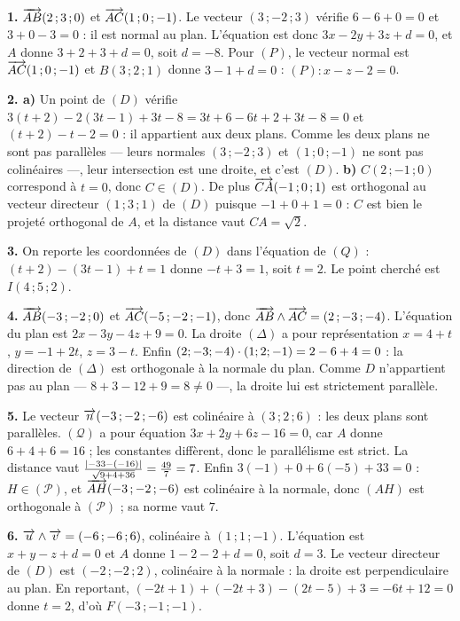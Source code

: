 \begin{corrige}[annales]
\textbf{1.} $\overrightarrow{AB}(2\,;3\,;0)$ et $\overrightarrow{AC}(1\,;0\,;-1)$. Le vecteur
$(3\,;-2\,;3)$ vérifie $6-6+0 = 0$ et $3+0-3 = 0$ : il est normal au plan.
L'équation est donc $3x-2y+3z+d = 0$, et $A$ donne $3+2+3+d = 0$, soit
$d = -8$. Pour $(P)$, le vecteur normal est $\overrightarrow{AC}(1\,;0\,;-1)$ et
$B(3\,;2\,;1)$ donne $3-1+d = 0$ : $(P) : x-z-2 = 0$.

\textbf{2. a)} Un point de $(D)$ vérifie
$3(t+2)-2(3t-1)+3t-8 = 3t+6-6t+2+3t-8 = 0$ et
$(t+2)-t-2 = 0$ : il appartient aux deux plans. Comme les deux plans ne sont
pas parallèles — leurs normales $(3\,;-2\,;3)$ et $(1\,;0\,;-1)$ ne sont pas
colinéaires —, leur intersection est une droite, et c'est $(D)$.
\textbf{b)} $C(2\,;-1\,;0)$ correspond à $t = 0$, donc $C \in (D)$. De plus
$\overrightarrow{CA}(-1\,;0\,;1)$ est orthogonal au vecteur directeur $(1\,;3\,;1)$ de
$(D)$ puisque $-1+0+1 = 0$ : $C$ est bien le projeté orthogonal de $A$, et la
distance vaut $CA = \sqrt2$.

\textbf{3.} On reporte les coordonnées de $(D)$ dans l'équation de $(Q)$ :
$(t+2)-(3t-1)+t = 1$ donne $-t+3 = 1$, soit $t = 2$. Le point cherché est
$I(4\,;5\,;2)$.

\textbf{4.} $\overrightarrow{AB}(-3\,;-2\,;0)$ et $\overrightarrow{AC}(-5\,;-2\,;-1)$, donc
$\overrightarrow{AB} \wedge \overrightarrow{AC} = (2\,;-3\,;-4)$. L'équation du plan est
$2x-3y-4z+9 = 0$. La droite $(\Delta)$ a pour représentation
$x = 4+t$, $y = -1+2t$, $z = 3-t$. Enfin
$(2;-3;-4) \cdot (1;2;-1) = 2-6+4 = 0$ : la direction de $(\Delta)$ est
orthogonale à la normale du plan. Comme $D$ n'appartient pas au plan
— $8+3-12+9 = 8 \neq 0$ —, la droite lui est strictement parallèle.

\textbf{5.} Le vecteur $\overrightarrow{n}(-3\,;-2\,;-6)$ est colinéaire à $(3\,;2\,;6)$ :
les deux plans sont parallèles. $(\mathcal Q)$ a pour équation
$3x+2y+6z-16 = 0$, car $A$ donne $6+4+6 = 16$ ; les constantes diffèrent, donc
le parallélisme est strict. La distance vaut
$\frac{\left|-33-(-16)\right|}{\sqrt{9+4+36}} = \frac{49}{7} = 7$. Enfin
$3(-1)+0+6(-5)+33 = 0$ : $H \in (\mathcal P)$, et
$\overrightarrow{AH}(-3\,;-2\,;-6)$ est colinéaire à la normale, donc $(AH)$ est
orthogonale à $(\mathcal P)$ ; sa norme vaut $7$.

\textbf{6.} $\overrightarrow{u} \wedge \overrightarrow{v} = (-6\,;-6\,;6)$, colinéaire à
$(1\,;1\,;-1)$. L'équation est $x+y-z+d = 0$ et $A$ donne $1-2-2+d = 0$, soit
$d = 3$. Le vecteur directeur de $(D)$ est $(-2\,;-2\,;2)$, colinéaire à la
normale : la droite est perpendiculaire au plan. En reportant,
$(-2t+1)+(-2t+3)-(2t-5)+3 = -6t+12 = 0$ donne $t = 2$, d'où
$F(-3\,;-1\,;-1)$.


\end{corrige}

